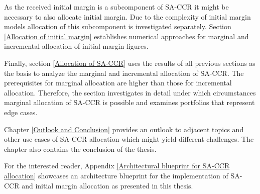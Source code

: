 \documentclass[../Thesis_AHoecherl.tex]{subfiles}
\begin{document}
    As the received initial margin is a subcomponent of SA-CCR it might be necessary to also allocate initial margin. Due to the complexity of initial margin models allocation of this subcomponent is investigated separately. Section \ref{Allocation of initial margin} establishes numerical approaches for marginal and incremental allocation of initial margin figures.

    Finally, section \ref{Allocation of SA-CCR} uses the results of all previous sections as the basis to analyze the marginal and incremental allocation of SA-CCR. The prerequisites for marginal allocation are higher than those for incremental allocation. Therefore, the section investigates in detail under which circumstances marginal allocation of SA-CCR is possible and examines portfolios that represent edge cases.
    
    Chapter \ref{Outlook and Conclusion} provides an outlook to adjacent topics and other use cases of SA-CCR allocation which might yield different challenges. The chapter also contains the conclusion of the thesis.

    For the interested reader, Appendix \ref{Architectural blueprint for SA-CCR allocation} showcases an architecture blueprint for the implementation of SA-CCR and initial margin allocation as presented in this thesis.
\end{document}
